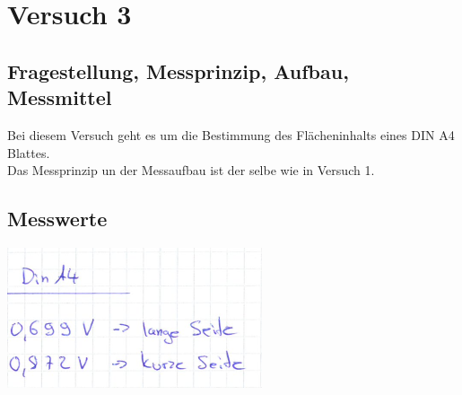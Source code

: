 \documentclass[12pt, oneside, a4paper, \docLanguage]{report}
\begin{document}
\chapter{Versuch 3}
\label{chap:VERSUCH_3}

\section{Fragestellung, Messprinzip, Aufbau, Messmittel}
\label{chap:VERSUCH_3_FRAGESTELLUNG}
\begin{normalsize}
Bei diesem Versuch geht es um die Bestimmung des Flächeninhalts eines DIN A4 Blattes.\\
Das Messprinzip un der Messaufbau ist der selbe wie in Versuch 1.
\end{normalsize}

\section{Messwerte}
\label{chap:VERSUCH_3_MESSWERTE}
\begin{minipage}{\linewidth}
\begin{center}
\includegraphics[scale=1]{BlattMesswerte.png}
\end{center}
\end{minipage}
\end{document}
